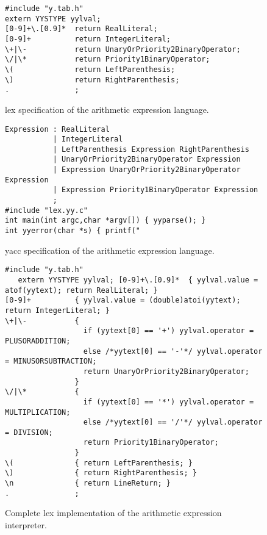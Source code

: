 \documentclass[preprint]{elsarticle}
\begin{document}
\begin{figure*}[tb!]
\begin{verbatim}
#include "y.tab.h"
extern YYSTYPE yylval;
[0-9]+\.[0.9]*  return RealLiteral;
[0-9]+          return IntegerLiteral;
\+|\-           return UnaryOrPriority2BinaryOperator;
\/|\*           return Priority1BinaryOperator;
\(              return LeftParenthesis;
\)              return RightParenthesis;
.               ;
\end{verbatim}
\caption{lex specification of the arithmetic expression language.} \label{fig:calclex}
\end{figure*}
\begin{figure*}[tb!]
\begin{verbatim}
Expression : RealLiteral
           | IntegerLiteral
           | LeftParenthesis Expression RightParenthesis
           | UnaryOrPriority2BinaryOperator Expression
           | Expression UnaryOrPriority2BinaryOperator Expression
           | Expression Priority1BinaryOperator Expression
           ;
#include "lex.yy.c"
int main(int argc,char *argv[]) { yyparse(); }
int yyerror(char *s) { printf("\end{verbatim}
\caption{yacc specification of the arithmetic expression language.} \label{fig:calcyacc}
\end{figure*}

\begin{figure*}[tb!]
\begin{verbatim}
#include "y.tab.h"
   extern YYSTYPE yylval; [0-9]+\.[0.9]*  { yylval.value = atof(yytext); return RealLiteral; }
[0-9]+          { yylval.value = (double)atoi(yytext); return IntegerLiteral; }
\+|\-           {
                  if (yytext[0] == '+') yylval.operator = PLUSORADDITION;
                  else /*yytext[0] == '-'*/ yylval.operator = MINUSORSUBTRACTION;
                  return UnaryOrPriority2BinaryOperator;
                }
\/|\*           {
                  if (yytext[0] == '*') yylval.operator = MULTIPLICATION;
                  else /*yytext[0] == '/'*/ yylval.operator = DIVISION;
                  return Priority1BinaryOperator;
                }
\(              { return LeftParenthesis; }
\)              { return RightParenthesis; }
\n              { return LineReturn; }
.               ;
\end{verbatim}
\caption{Complete lex implementation of the arithmetic expression interpreter.} \label{fig:calcimlex}
\end{figure*}
\end{document}

